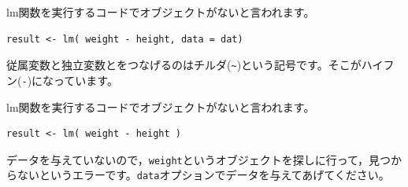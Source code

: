 \documentclass{ltjsbook}
\begin{document}
\begin{FAQ}{lm関数を実行するコードでオブジェクトがないと言われます。}{}
\begin{verbatim}
result <- lm( weight - height, data = dat)
\end{verbatim}
従属変数と独立変数とをつなげるのはチルダ(\verb|~|)という記号です。そこがハイフン(\verb|-|)になっています。
\end{FAQ}

\begin{FAQ}{lm関数を実行するコードでオブジェクトがないと言われます。}{}
\begin{verbatim}
result <- lm( weight - height )
\end{verbatim}
データを与えていないので，\verb|weight|というオブジェクトを探しに行って，見つからないというエラーです。\verb|data|オプションでデータを与えてあげてください。
\end{FAQ}
\end{document}
